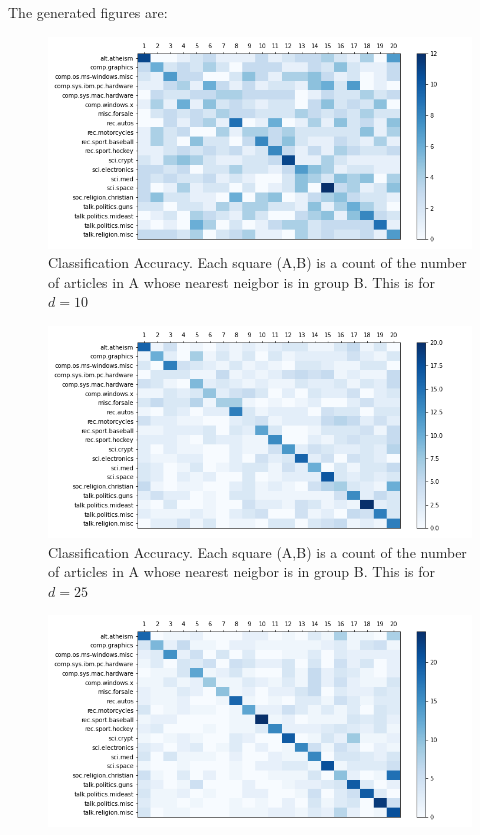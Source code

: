 \documentclass[12pt]{article}
\begin{document}
\begin{enumerate}[label=(\alph*)]
    The generated figures are:
    \begin{figure}[!ht]
      \centering
      \includegraphics[scale=0.5]{figures/classification_d=10.png}
      \caption{Classification Accuracy. Each square (A,B) is a count of the number of articles in A whose nearest neigbor is in group B. This is for $d=10$}
      \label{fig:classification_d_10}
    \end{figure}
    \begin{figure}[!ht]
      \centering
      \includegraphics[scale=0.5]{figures/classification_d=25.png}
      \caption{Classification Accuracy. Each square (A,B) is a count of the number of articles in A whose nearest neigbor is in group B. This is for $d=25$}
      \label{fig:classification_d_25}
    \end{figure}
    \begin{figure}[!ht]
      \centering
      \includegraphics[scale=0.5]{figures/classification_d=50.png}

\end{figure}
\end{enumerate}
\end{document}

